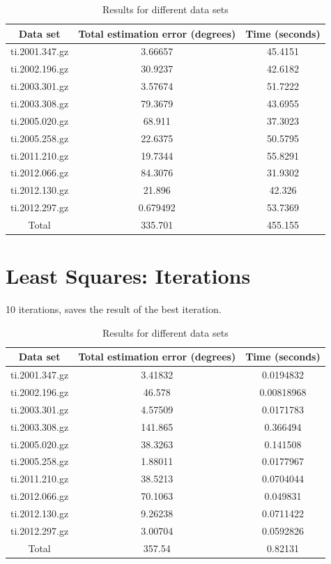 \begin{table}[h!]
	\centering
	\def\arraystretch{1.2}
	\begin{tabular}{|c c c|} 
		\hline
		Data set & Total estimation error (degrees) & Time (seconds) \\ [0.5ex] 
		\hline\hline
		ti.2001.347.gz & 3.66657 & 45.4151 \\
		\hline
		ti.2002.196.gz & 30.9237 & 42.6182 \\
		\hline
		ti.2003.301.gz & 3.57674 & 51.7222 \\
		\hline
		ti.2003.308.gz & 79.3679 & 43.6955 \\
		\hline
		ti.2005.020.gz & 68.911 & 37.3023 \\
		\hline
		ti.2005.258.gz & 22.6375 & 50.5795 \\
		\hline
		ti.2011.210.gz & 19.7344 & 55.8291 \\
		\hline
		ti.2012.066.gz & 84.3076 & 31.9302 \\
		\hline
		ti.2012.130.gz & 21.896 & 42.326 \\
		\hline
		ti.2012.297.gz & 0.679492 & 53.7369 \\
		\hline
		Total & 335.701 & 455.155 \\
		\hline
	\end{tabular}
	\caption{Results for different data sets}
\end{table}

\section{Least Squares: Iterations}

10 iterations, saves the result of the best iteration.

\begin{table}[h!]
	\centering
	\def\arraystretch{1.2}
	\begin{tabular}{|c c c|} 
		\hline
		Data set & Total estimation error (degrees) & Time (seconds) \\ [0.5ex] 
		\hline\hline
		ti.2001.347.gz & 3.41832 & 0.0194832 \\
		\hline
		ti.2002.196.gz & 46.578 & 0.00818968 \\
		\hline
		ti.2003.301.gz & 4.57509 & 0.0171783 \\
		\hline
		ti.2003.308.gz & 141.865 & 0.366494 \\
		\hline
		ti.2005.020.gz & 38.3263 & 0.141508 \\
		\hline
		ti.2005.258.gz & 1.88011 & 0.0177967 \\
		\hline
		ti.2011.210.gz & 38.5213 & 0.0704044 \\
		\hline
		ti.2012.066.gz & 70.1063 & 0.049831 \\
		\hline
		ti.2012.130.gz & 9.26238 & 0.0711422 \\
		\hline
		ti.2012.297.gz & 3.00704 & 0.0592826 \\
		\hline
		Total & 357.54 & 0.82131 \\
		\hline
	\end{tabular}
	\caption{Results for different data sets}
\end{table}


